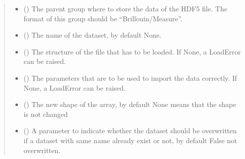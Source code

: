 \documentclass[letterpaper,10pt,english]{sphinxmanual}
\begin{document}
\begin{fulllineitems}
\begin{fulllineitems}
\begin{quote}
\begin{description}
\begin{itemize}
\item {} 
\sphinxAtStartPar
{} (\sphinxstyleliteralemphasis{\sphinxupquote{, }}) \textendash{} The parent group where to store the data of the HDF5 file. The format of this group should be “Brillouin/Measure”.

\item {} 
\sphinxAtStartPar
{} (\sphinxstyleliteralemphasis{\sphinxupquote{, }}) \textendash{} The name of the dataset, by default None.

\item {} 
\sphinxAtStartPar
{} (\sphinxstyleliteralemphasis{\sphinxupquote{, }}) \textendash{} The structure of the file that has to be loaded. If None, a LoadError can be raised.

\item {} 
\sphinxAtStartPar
{} (\sphinxstyleliteralemphasis{\sphinxupquote{, }}) \textendash{} The parameters that are to be used to import the data correctly.  If None, a LoadError can be raised.

\item {} 
\sphinxAtStartPar
{} (\sphinxstyleliteralemphasis{\sphinxupquote{, }}) \textendash{} The new shape of the array, by default None means that the shape is not changed

\item {} 
\sphinxAtStartPar
{} (\sphinxstyleliteralemphasis{\sphinxupquote{, }}) \textendash{} A parameter to indicate whether the dataset should be overwritten if a dataset with same name already exist or not, by default False \sphinxhyphen{} not overwritten.

\end{itemize}


\end{description}
\end{quote}
\end{fulllineitems}
\end{fulllineitems}
\end{document}
